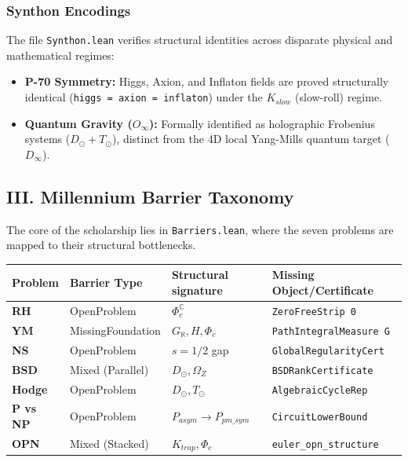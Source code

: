\documentclass[12pt,a4paper]{article}
\begin{document}
\subsubsection{Synthon Encodings}

The file \texttt{Synthon.lean} verifies structural identities across disparate physical and mathematical regimes:

\begin{itemize}
    \item \textbf{P-70 Symmetry:} Higgs, Axion, and Inflaton fields are proved structurally identical (\texttt{higgs = axion = inflaton}) under the $K_{slow}$ (slow-roll) regime.
    \item \textbf{Quantum Gravity ($O_{\infty}$):} Formally identified as holographic Frobenius systems ($D_{\odot} + T_{\odot}$), distinct from the 4D local Yang-Mills quantum target ($D_{\infty}$).
\end{itemize}

\subsection{III. Millennium Barrier Taxonomy}

The core of the scholarship lies in \texttt{Barriers.lean}, where the seven problems are mapped to their structural bottlenecks.

\begin{table}[htbp]
\centering
\small
{}
\begin{tabularx}{\textwidth}{>{\centering\arraybackslash}X >{\centering\arraybackslash}X >{\centering\arraybackslash}X >{\centering\arraybackslash}X}
\toprule
\rowcolor{gray!25}\textbf{Problem} & \textbf{Barrier Type} & \textbf{Structural signature} & \textbf{Missing Object/Certificate} \\
\midrule
\rowcolors{1}{white}{gray!10}
\textbf{RH} & OpenProblem & $\Phi_c^\mathbb{C}$ & \texttt{ZeroFreeStrip 0} \\
\textbf{YM} & MissingFoundation & $G_{\aleph}, H, \Phi_c$ & \texttt{PathIntegralMeasure G} \\
\textbf{NS} & OpenProblem & $s = 1/2$ gap & \texttt{GlobalRegularityCert} \\
\textbf{BSD} & Mixed (Parallel) & $D_{\odot}, \Omega_Z$ & \texttt{BSDRankCertificate} \\
\textbf{Hodge} & OpenProblem & $D_{\odot}, T_{\odot}$ & \texttt{AlgebraicCycleRep} \\
\textbf{P vs NP} & OpenProblem & $P_{asym} \to P_{pm\_sym}$ & \texttt{CircuitLowerBound} \\
\textbf{OPN} & Mixed (Stacked) & $K_{trap}, \Phi_c$ & \texttt{euler\_opn\_structure} \\
\bottomrule
\end{tabularx}
\end{table}
\end{document}

